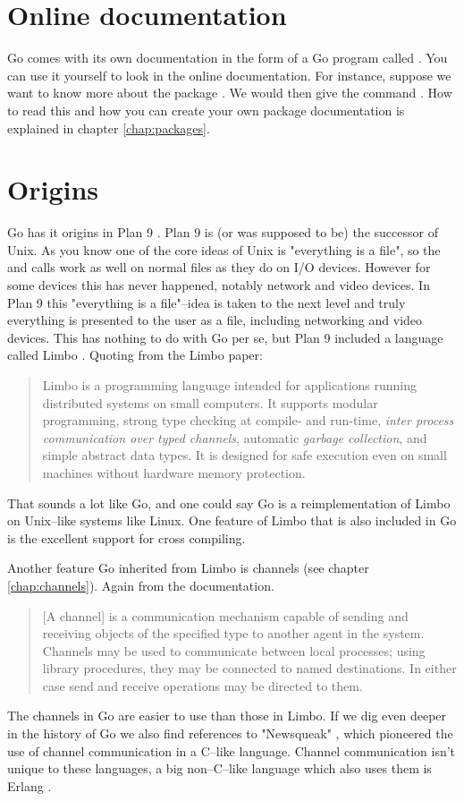 \section{Online documentation}
Go comes with its own documentation in the form of a Go program called
. 
You can use it yourself to look
in the online documentation. For
instance, suppose we want to know more about the package .
We would then give the command .
How to read this and how you can create your own package documentation
is explained in chapter \ref{chap:packages}.

\section{Origins}
Go has it origins in Plan 9 \cite{plan9}. Plan 9 is (or was 
supposed to be) the successor of Unix. As you know one of the
core ideas of Unix is "everything is a file", so the  and
 calls work as well on normal files as they do on I/O
devices. However for some devices this has never happened, notably
network and video devices. In Plan 9 this "everything is a file"--idea
is taken to the next level and truly everything is presented to the 
user as a file, including networking and video devices. This has nothing
to do with Go per se, but Plan 9 included a language called Limbo
\cite{limbo}. Quoting from the Limbo paper:
\begin{quote}
Limbo is a programming language intended for applications running
distributed systems on small computers. It supports modular programming,
strong type checking at compile- and run-time, \emph{inter process
communication over typed channels}, automatic \emph{garbage collection}, and
simple abstract data types. It is designed for safe execution even on
small machines without hardware memory protection.
\end{quote}
That sounds a lot like Go, and one could say Go is a reimplementation of
Limbo on Unix--like systems like Linux. One feature of Limbo that is
also included in Go is the excellent support for cross compiling.

Another feature Go inherited from Limbo is channels (see chapter
\ref{chap:channels}). Again from the documentation.
\begin{quote}
[A channel] is a communication mechanism capable of sending and receiving objects of
the specified type to another agent in the system. Channels may be used
to communicate between local processes; using library procedures, they
may be connected to named destinations. In either case send and receive
operations may be directed to them.
\end{quote}
The channels in Go are easier to use than those in Limbo.
If we dig even deeper in the history of Go we also find references
to "Newsqueak" \cite{newsqueak}, which pioneered the use of 
channel communication in a C--like language. Channel
communication isn't unique to these languages, a big non--C--like
language which also uses them is Erlang \cite{erlang}.

